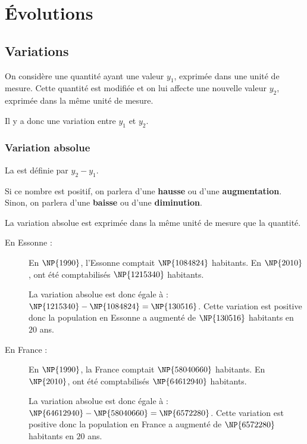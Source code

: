 \documentclass[10pt,openright,twoside,french]{book}
\begin{document}
\chapter{\'Evolutions}\label{ch_evolution}

\section{Variations}
On considère une quantité ayant une valeur $y_1$, exprimée dans une unité de mesure. Cette quantité est modifiée et on lui affecte une nouvelle valeur $y_2$, exprimée dans la même unité de mesure.\par
Il y a donc une variation entre $y_1$ et $y_2$.

\subsection{Variation absolue}
\begin{Defi}
    La  est définie par $y_2 - y_1$.\par
    Si ce nombre est positif, on parlera d'une \textbf{hausse} ou d'une \textbf{augmentation}. Sinon, on parlera d'une \textbf{baisse} ou d'une \textbf{diminution}.
\end{Defi}

\begin{Rmq}
    La variation absolue est exprimée dans la même unité de mesure que la quantité.
\end{Rmq}

\begin{Exemple}[s]
    \begin{description}
        \item[En Essonne :] En $\NP{1990}$, l'Essonne comptait $\NP{1084824}$ habitants. En $\NP{2010}$, ont été comptabilisés $\NP{1215340}$ habitants.\par
        La variation absolue est donc égale à : $\NP{1215340} - \NP{1084824} = \NP{130516}$. Cette variation est positive donc la population en Essonne a augmenté de $\NP{130516}$ habitants en $20$ ans.
        \item[En France :] En $\NP{1990}$, la France comptait $\NP{58 040 660}$ habitants. En $\NP{2010}$, ont été comptabilisés $\NP{64 612 940}$ habitants.\par
        La variation absolue est donc égale à : $\NP{64 612 940} - \NP{58 040 660} = \NP{6572280}$. Cette variation est positive donc la population en France a augmenté de $\NP{6572280}$ habitants en $20$ ans.
    \end{description}
\end{Exemple}
\end{document}
